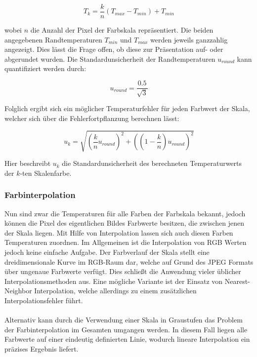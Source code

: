 \documentclass{article}
\begin{document}
\begin{equation}
    T_{k} = \frac{k}{n} \left(T_{max} - T_{min}\right) + T_{min}
\end{equation}

wobei $n$ die Anzahl der Pixel der Farbskala repräsentiert.
Die beiden angegebenen Randtemperaturen $T_{min}$ und $T_{max}$ werden jeweils ganzzahlig angezeigt.
Dies lässt die Frage offen, ob diese zur Präsentation auf- oder abgerundet wurden.
Die Standardunsicherheit der Randtemperaturen $u_{round}$ kann quantifiziert werden durch:

\begin{equation}
    u_{round} = \frac{0.5}{\sqrt{3}}
\end{equation}

Folglich ergibt sich ein möglicher Temperaturfehler für jeden Farbwert der Skala, welcher sich über die Fehlerfortpflanzung berechnen lässt:

\begin{equation}
    u_k = \sqrt{\left(\frac{k}{n} u_{round} \right)^2 + \left(\left(1 - \frac{k}{n}\right) u_{round}\right)^2}
\end{equation}

Hier beschreibt $u_k$ die Standardunsicherheit des berechneten Temperaturwerts der $k$-ten Skalenfarbe.

\subsubsection{Farbinterpolation}
Nun sind zwar die Temperaturen für alle Farben der Farbskala bekannt, jedoch können die Pixel des eigentlichen Bildes Farbwerte besitzen, die zwischen jenen der Skala liegen.
Mit Hilfe von Interpolation lassen sich auch diesen Farben Temperaturen zuordnen.
Im Allgemeinen ist die Interpolation von RGB Werten jedoch keine einfache Aufgabe. 
Der Farbverlauf der Skala stellt eine dreidimensionale Kurve im RGB-Raum dar, welche auf Grund des JPEG Formats über ungenaue Farbwerte verfügt.
Dies schließt die Anwendung vieler üblicher Interpolationsmethoden aus.
Eine mögliche Variante ist der Einsatz von Nearest-Neighbor Interpolation, welche allerdings zu einem zusätzlichen Interpolationsfehler führt.
\\
\\
Alternativ kann durch die Verwendung einer Skala in Graustufen das Problem der Farbinterpolation im Gesamten umgangen werden.
In diesem Fall liegen alle Farbwerte auf einer eindeutig definierten Linie, wodurch lineare Interpolation ein präzises Ergebnis liefert.
\end{document}
